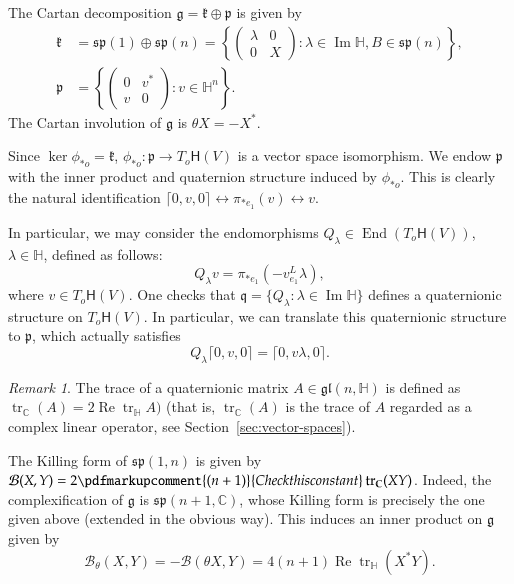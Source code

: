 \documentclass[12pt, a4paper]{amsart}
\newcommand{\g}{\mathfrak}
\newcommand{\tr}{\operatorname{tr}}
\newcommand{\C}{\mathbb{C}}
\renewcommand{\H}{\mathbb{H}}
\renewcommand{\Re}{\operatorname{Re}}
\renewcommand{\Im}{\operatorname{Im}}
\theoremstyle{remark}
\newtheorem*{remark}{Remark}
\begin{document}
The Cartan decomposition $\g{g}=\g{k}\oplus\g{p}$ is given by
\[
\begin{aligned}
\g{k}&
{}=\g{sp}(1)\oplus\g{sp}(n)
=\left\{
	\left(
	\begin{array}{c|c}
		\lambda & 0 \\
		\hline
		0 & X
	\end{array}
	\right):
	\lambda \in \Im \H, B\in \g{sp}(n)
\right\}, \\
\g{p}&
{}=\left\{
\left(
	\begin{array}{c|c}
		0 & v^{*} \\
		\hline
		v & 0
	\end{array}
\right):
v\in \H ^{n}
\right\}.
\end{aligned}
\]
The Cartan involution of $\g{g}$ is $\theta X = -X^{*}$.

Since $\ker\phi_{*o}=\g{k}$, $\phi_{*o}\colon\g{p}\to T_o\mathsf{H}(V)$ is a vector space isomorphism.
We endow $\g{p}$ with the inner product and quaternion structure induced by $\phi_{*o}$.
This is clearly the natural identification $\lceil 0,v,0\rceil \leftrightarrow \pi_{*e_1}(v) \leftrightarrow v$.

In particular, we may consider the endomorphisms $Q_{\lambda}\in \operatorname{End}(T_{o}\mathsf{H}(V))$, $\lambda\in \H$, defined as follows:
\[
Q_{\lambda}v=\pi_{*e_{1}}\left(-v^{L}_{e_{1}}\lambda\right),
\]
where $v\in T_{o}\mathsf{H}(V)$.
One checks that $\g{q}=\{Q_{\lambda}\colon \lambda\in \Im\H\}$ defines a quaternionic structure on $T_{o}\mathsf{H}(V)$.
In particular, we can translate this quaternionic structure to $\g{p}$, which actually satisfies
\begin{equation*}
	Q_{\lambda}\lceil 0,v,0\rceil=\lceil 0,v\lambda,0 \rceil.
\end{equation*}

\begin{remark}
	The trace of a quaternionic matrix $A\in \g{gl}(n,\H)$ is defined as $\tr_{\C}(A)=2 \Re\tr_{\H} A)$ 
	(that is, $\tr_{\C}(A)$ is the trace of $A$ regarded as a complex linear operator, see Section~\ref{sec:vector-spaces}).
\end{remark}

The Killing form of $\g{sp}(1,n)$ is given by $\mathcal{B}(X,Y)=2\pdfmarkupcomment{(n+1)}{Check this constant}\tr_{\C}(XY)$.
Indeed, the complexification of $\g{g}$ is $\g{sp}(n+1,\C)$, whose Killing form is precisely the one given above (extended in the obvious way).
This induces an inner product on $\g{g}$ given by 
\[
\mathcal{B}_{\theta}(X,Y)
=-\mathcal{B}(\theta X, Y)
=4(n+1)\Re\tr_{\H}(X^{*}Y).
\]
\end{document}
